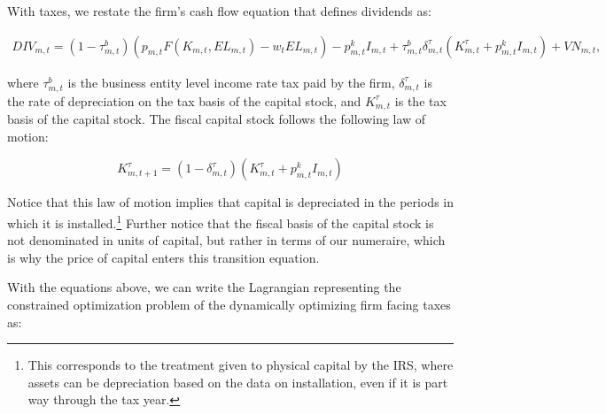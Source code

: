\documentclass[letterpaper,12pt]{article}
\theoremstyle{definition}
\begin{document}
\begin{spacing}{1.5}
With taxes, we restate the firm's cash flow equation that defines dividends as: 

\begin{equation}
\label{eqn:div_tax}
\begin{split}
 DIV_{m,t}= (1-\tau^{b}_{m,t})\left(p_{m,t}F(K_{m,t},EL_{m,t})-w_{t}EL_{m,t}\right) - p^{k}_{m,t}I_{m,t} + \tau^{b}_{m,t}\delta^{\tau}_{m,t}(K^{\tau}_{m,t}+ p^{k}_{m,t}I_{m,t})+ VN_{m,t},
 \end{split}
\end{equation}

\noindent\noindent where $\tau^{b}_{m,t}$ is the business entity level income rate tax paid by the firm, $\delta^{\tau}_{m,t}$ is the rate of depreciation on the tax basis of the capital stock, and $K^{\tau}_{m,t}$ is the tax basis of the capital stock.  The fiscal capital stock follows the following law of motion:

\begin{equation}
\label{eqn:tax_cap_lom}
K^{\tau}_{m,t+1} = (1-\delta^{\tau}_{m,t})(K^{\tau}_{m,t} + p^{k}_{m,t}I_{m,t})
\end{equation}

\noindent\noindent Notice that this law of motion implies that capital is depreciated in the periods in which it is installed.\footnote{This corresponds to the treatment given to physical capital by the IRS, where assets can be depreciation based on the data on installation, even if it is part way through the tax year.}  Further notice that the fiscal basis of the capital stock is not denominated in units of capital, but rather in terms of our numeraire, which is why the price of capital enters this transition equation.

With the equations above, we can write the Lagrangian representing the constrained optimization problem of the dynamically optimizing firm facing taxes as: 


\end{spacing}
\end{document}
